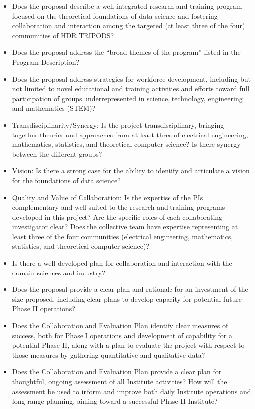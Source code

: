 \documentclass{article}
\begin{document}
\begin{itemize}
    \item Does the proposal describe a well-integrated research and training program focused on the theoretical foundations of data science and fostering collaboration and interaction among the targeted (at least three of the four) communities of HDR TRIPODS?
    \item Does the proposal address the “broad themes of the program” listed in the Program Description?
    \item Does the proposal address strategies for workforce development, including but not limited to novel educational and training activities and efforts toward full participation of groups underrepresented in science, technology, engineering and mathematics (STEM)?
    \item Transdisciplinarity/Synergy: Is the project transdisciplinary, bringing together theories and approaches from at least three of electrical engineering, mathematics, statistics, and theoretical computer science? Is there synergy between the different groups?
    \item Vision: Is there a strong case for the ability to identify and articulate a vision for the foundations of data science?
    \item Quality and Value of Collaboration: Is the expertise of the PIs complementary and well-suited to the research and training programs developed in this project? Are the specific roles of each collaborating investigator clear? Does the collective team have expertise representing at least three of the four communities (electrical engineering, mathematics, statistics, and theoretical computer science)?
    \item Is there a well-developed plan for collaboration and interaction with the domain sciences and industry?
    \item Does the proposal provide a clear plan and rationale for an investment of the size proposed, including clear plans to develop capacity for potential future Phase II operations?
    \item Does the Collaboration and Evaluation Plan identify clear measures of success, both for Phase I operations and development of capability for a potential Phase II, along with a plan to evaluate the project with respect to those measures by gathering quantitative and qualitative data?
    \item Does the Collaboration and Evaluation Plan provide a clear plan for thoughtful, ongoing assessment of all Institute activities? How will the assessment be used to inform and improve both daily Institute operations and long-range planning, aiming toward a successful Phase II Institute?

\end{itemize}



{

%

}
\end{document}
